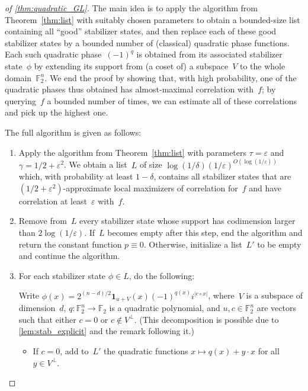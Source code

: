 \documentclass[10pt,a4paper]{amsart}
\newcommand{\F}{\mathbb{F}} %
\newcommand{\eps}{\varepsilon}
\newcommand{\one}{\mathbf{1}}
\begin{document}
\begin{proof}[ of \cref{thm:quadratic_GL}]
The main idea is to apply the algorithm from Theorem~\ref{thm:list} with suitably chosen parameters to obtain a bounded-size list containing all ``good'' stabilizer states, and then replace each of these good stabilizer states by a bounded number of (classical) quadratic phase functions.
Each such quadratic phase~$(-1)^q$ is obtained from its associated stabilizer state~$\phi$ by extending its support from (a coset of) a subspace~$V$ to the whole domain~$\F_2^n$.
We end the proof by showing that, with high probability, one of the quadratic phases thus obtained has almost-maximal correlation with~$f$;
by querying~$f$ a bounded number of times, we can estimate all of these correlations and pick up the highest one.

The full algorithm is given as follows:
\begin{enumerate}
    \item Apply the algorithm from Theorem~\ref{thm:list} with parameters $\tau = \eps$ and $\gamma = 1/2 + \eps^2$.
    We obtain a list~$L$ of size $\log(1/\delta) (1/\eps)^{O(\log(1/\eps))}$ which, with probability at least $1-\delta$, contains all stabilizer states that are $(1/2+\eps^2)$-approximate local maximizers of correlation for~$f$ and have correlation at least~$\eps$ with~$f$.
    
    \item Remove from~$L$ every stabilizer state whose support has codimension larger than $2\log(1/\eps)$.
    If~$L$ becomes empty after this step, end the algorithm and return the constant function $p \equiv 0$.
    Otherwise, initialize a list~$L'$ to be empty and continue the algorithm.
    
    \item For each stabilizer state $\phi\in L$, do the following:

    \noindent Write $\phi(x) = 2^{(n-d)/2} \one_{u+V}(x) (-1)^{q(x)} i^{|c\circ x|}$, where~$V$ is a subspace of dimension~$d$, $q: \F_2^n \to \F_2$ is a quadratic polynomial, and $u, c \in \F_2^n$ are vectors such that either $c=0$ or $c\notin V^\perp$.
    (This decomposition is possible due to \cref{lem:stab_explicit} and the remark following it.)
    \begin{itemize}
        \item[$(a)$] If $c=0$, add to~$L'$ the quadratic functions $x\mapsto q(x)+y\cdot x$ for all $y\in V^\perp$.


\end{itemize}
\end{enumerate}
\end{proof}
\end{document}
